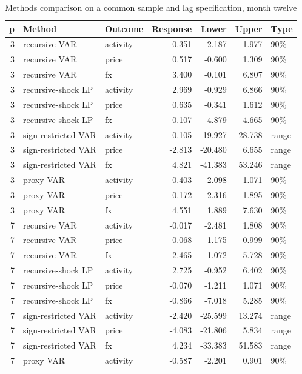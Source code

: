 \begin{table}[htbp]
\centering
\footnotesize
\caption{Methods comparison on a common sample and lag specification, month twelve}
\begin{tabularx}{\linewidth}{rXlrrrl}
\toprule
p & Method & Outcome & Response & Lower & Upper & Type \\
\midrule
3 & recursive VAR & activity & 0.351 & -2.187 & 1.977 & 90\% \\
3 & recursive VAR & price & 0.517 & -0.600 & 1.309 & 90\% \\
3 & recursive VAR & fx & 3.400 & -0.101 & 6.807 & 90\% \\
3 & recursive-shock LP & activity & 2.969 & -0.929 & 6.866 & 90\% \\
3 & recursive-shock LP & price & 0.635 & -0.341 & 1.612 & 90\% \\
3 & recursive-shock LP & fx & -0.107 & -4.879 & 4.665 & 90\% \\
3 & sign-restricted VAR & activity & 0.105 & -19.927 & 28.738 & range \\
3 & sign-restricted VAR & price & -2.813 & -20.480 & 6.655 & range \\
3 & sign-restricted VAR & fx & 4.821 & -41.383 & 53.246 & range \\
3 & proxy VAR & activity & -0.403 & -2.098 & 1.071 & 90\% \\
3 & proxy VAR & price & 0.172 & -2.316 & 1.895 & 90\% \\
3 & proxy VAR & fx & 4.551 & 1.889 & 7.630 & 90\% \\
7 & recursive VAR & activity & -0.017 & -2.481 & 1.808 & 90\% \\
7 & recursive VAR & price & 0.068 & -1.175 & 0.999 & 90\% \\
7 & recursive VAR & fx & 2.465 & -1.072 & 5.728 & 90\% \\
7 & recursive-shock LP & activity & 2.725 & -0.952 & 6.402 & 90\% \\
7 & recursive-shock LP & price & -0.070 & -1.211 & 1.071 & 90\% \\
7 & recursive-shock LP & fx & -0.866 & -7.018 & 5.285 & 90\% \\
7 & sign-restricted VAR & activity & -2.420 & -25.599 & 13.274 & range \\
7 & sign-restricted VAR & price & -4.083 & -21.806 & 5.834 & range \\
7 & sign-restricted VAR & fx & 4.234 & -33.383 & 51.583 & range \\
7 & proxy VAR & activity & -0.587 & -2.201 & 0.901 & 90\% \\

\end{tabularx}
\end{table}
